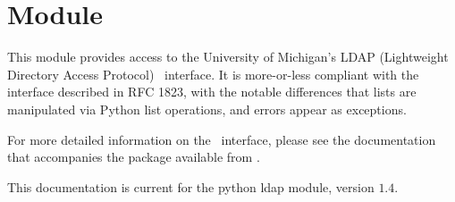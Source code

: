

\section{Module } \label{app:ldapmodule}


\renewcommand{\indexsubitem}{(in module ldap)}

This module provides access to the University of Michigan's LDAP 
(Lightweight Directory Access Protocol) \C\ interface. 
It is more-or-less compliant with the interface described in RFC 1823,
with the notable differences that lists are manipulated via Python
list operations, and errors appear as exceptions.

For more detailed information on the \C\ interface, 
please see the documentation that accompanies the package available from
.

This documentation is current for the python ldap module, version
$1.4$.







